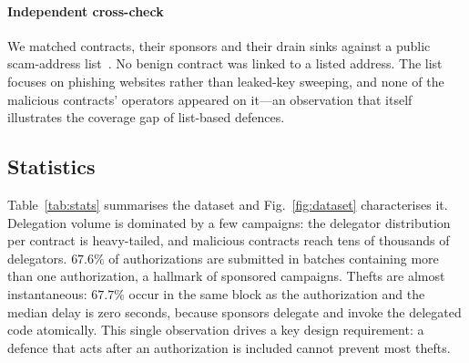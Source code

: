 \paragraph{Independent cross-check} We matched contracts, their sponsors and their drain sinks against a public scam-address list~\cite{scamsniffer}. No benign contract was linked to a listed address. The list focuses on phishing websites rather than leaked-key sweeping, and none of the malicious contracts' operators appeared on it---an observation that itself illustrates the coverage gap of list-based defences.

\subsection{Statistics}
Table~\ref{tab:stats} summarises the dataset and Fig.~\ref{fig:dataset} characterises it. Delegation volume is dominated by a few campaigns: the delegator distribution per contract is heavy-tailed, and malicious contracts reach tens of thousands of delegators. $67.6\%$ of authorizations are submitted in batches containing more than one authorization, a hallmark of sponsored campaigns. Thefts are almost instantaneous: $67.7\%$ occur in the same block as the authorization and the median delay is zero seconds, because sponsors delegate and invoke the delegated code atomically. This single observation drives a key design requirement: a defence that acts after an authorization is included cannot prevent most thefts.

